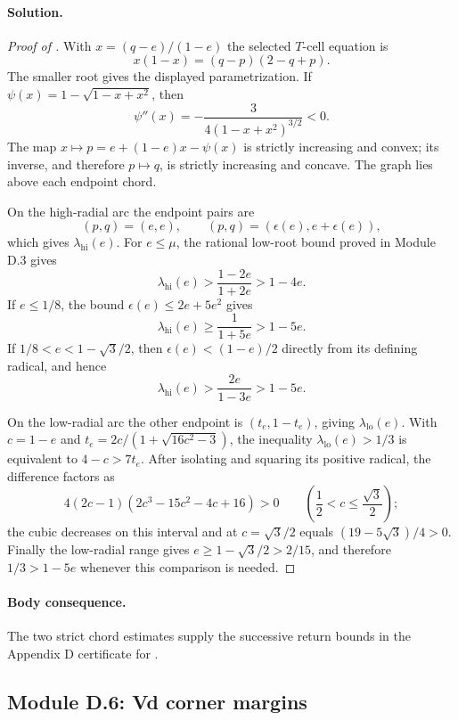 \paragraph{Solution.}

\begin{proof}[Proof of ]
With $x=(q-e)/(1-e)$ the selected $T$-cell equation is
\[
 x(1-x)=(q-p)(2-q+p).
\]
The smaller root gives the displayed parametrization.  If
$\psi(x)=1-\sqrt{1-x+x^2}$, then
\[
 \psi''(x)=-\frac3{4(1-x+x^2)^{3/2}}<0.
\]
The map $x\mapsto p=e+(1-e)x-\psi(x)$ is strictly increasing and convex;
its inverse, and therefore $p\mapsto q$, is strictly increasing and concave.
The graph lies above each endpoint chord.

On the high-radial arc the endpoint pairs are
\[
 (p,q)=(e,e),
 \qquad (p,q)=(\epsilon(e),e+\epsilon(e)),
\]
which gives $\lambda_{\mathrm{hi}}(e)$.  For $e\le\mu$, the rational
low-root bound proved in Module D.3 gives
\[
 \lambda_{\mathrm{hi}}(e)
 >\frac{1-2e}{1+2e}>1-4e.
\]
If $e\le1/8$, the bound
$\epsilon(e)\le2e+5e^2$ gives
\[
 \lambda_{\mathrm{hi}}(e)\ge\frac1{1+5e}>1-5e.
\]
If $1/8<e<1-\sqrt3/2$, then
$\epsilon(e)<(1-e)/2$ directly from its defining radical, and hence
\[
 \lambda_{\mathrm{hi}}(e)>
 \frac{2e}{1-3e}>1-5e.
\]

On the low-radial arc the other endpoint is $(t_e,1-t_e)$, giving
$\lambda_{\mathrm{lo}}(e)$.  With $c=1-e$ and
$t_e=2c/(1+\sqrt{16c^2-3})$, the inequality
$\lambda_{\mathrm{lo}}(e)>1/3$ is equivalent to
$4-c>7t_e$.  After isolating and squaring its positive radical, the
difference factors as
\[
 4(2c-1)(2c^3-15c^2-4c+16)>0
 \qquad\left(\frac12<c\le\frac{\sqrt3}{2}\right);
\]
the cubic decreases on this interval and at $c=\sqrt3/2$ equals
$(19-5\sqrt3)/4>0$.  Finally the low-radial range gives
$e\ge1-\sqrt3/2>2/15$, and therefore
$1/3>1-5e$ whenever this comparison is needed.
\end{proof}

\paragraph{Body consequence.}
The two strict chord estimates supply the successive return bounds in the
Appendix D certificate for .

\subsection{Module D.6: Vd corner margins}

